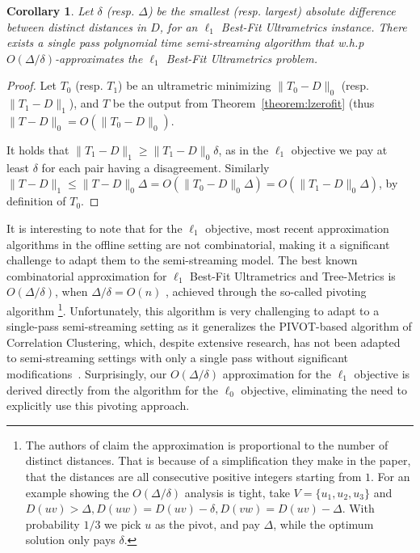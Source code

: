 \documentclass{article}
\newtheorem{corollary}[theorem]{Corollary}
\newcommand{\set}[1]{\{#1\}}
\begin{document}
\begin{corollary} \label{cor:l1ApxUltra}
Let $\delta$ (resp. $\Delta$) be the smallest (resp. largest) absolute difference between distinct distances in $D$, for an $\ell_1$ Best-Fit Ultrametrics instance. There exists a single pass polynomial time semi-streaming algorithm that w.h.p $O(\Delta/\delta)$-approximates the $\ell_1$ Best-Fit Ultrametrics problem.
\end{corollary}
\begin{proof}
Let $T_0$ (resp. $T_1$) be an ultrametric minimizing $\|T_0-D\|_0$ (resp. $\|T_1-D\|_1$), and $T$ be the output from Theorem~\ref{theorem:lzerofit} (thus $\|T-D\|_0 = O(\|T_0-D\|_0)$.

It holds that $\|T_1-D\|_1 \ge \|T_1-D\|_0 \delta$, as in the $\ell_1$ objective we pay at least $\delta$ for each pair having a disagreement.
Similarly $\|T-D\|_1 \le \|T-D\|_0 \Delta = O(\|T_0-D\|_0 \Delta) = O(\|T_1-D\|_0 \Delta)$, by definition of $T_0$.
\end{proof}

It is interesting to note that for the $\ell_1$ objective, most recent approximation algorithms in the offline setting are not combinatorial, making it a significant challenge to adapt them to the semi-streaming model. 
The best known combinatorial approximation for \(\ell_1\) Best-Fit Ultrametrics and Tree-Metrics is \(O(\Delta/\delta)\), when \(\Delta/\delta = O(n)\) \cite{charikar, mcgregor}, achieved through the so-called pivoting algorithm
\footnote{The authors of \cite{charikar} claim the approximation is proportional to the number of distinct distances. That is because of a simplification they make in the paper, that the distances are all consecutive positive integers starting from $1$. For an example showing the $O(\Delta/\delta)$ analysis is tight, take $V=\set{u_1,u_2,u_3}$ and $D(uv)>\Delta, D(uw) = D(uv)-\delta, D(vw)=D(uv)-\Delta$. With probability $1/3$ we pick $u$ as the pivot, and pay $\Delta$, while the optimum solution only pays $\delta$.}.
Unfortunately, this algorithm is very challenging to adapt to a single-pass semi-streaming setting as it generalizes the PIVOT-based algorithm of Correlation Clustering, which, despite extensive research, has not been adapted to semi-streaming settings with only a single pass without significant modifications~\cite{BehnezhadCMT22, BehnezhadCMT23, CambusKLPU24, chakrabarty2023single}. 
Surprisingly, our \(O(\Delta/\delta)\) approximation for the \(\ell_1\) objective is derived directly from the algorithm for the \(\ell_0\) objective, eliminating the need to explicitly use this pivoting approach.
\end{document}
